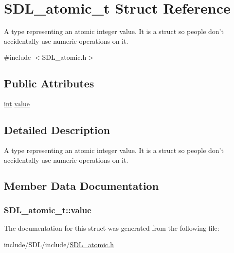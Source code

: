 \hypertarget{struct_s_d_l__atomic__t}{\section{S\-D\-L\-\_\-atomic\-\_\-t Struct Reference}
\label{struct_s_d_l__atomic__t}
}


A type representing an atomic integer value. It is a struct so people don't accidentally use numeric operations on it.  




{\ttfamily \#include $<$S\-D\-L\-\_\-atomic.\-h$>$}

\subsection*{Public Attributes}
\begin{DoxyCompactItemize}
\item 
\hyperlink{_s_d_l__thread_8h_a6a64f9be4433e4de6e2f2f548cf3c08e}{int} \hyperlink{struct_s_d_l__atomic__t_a0d09ddf3cc5798c709edb7cea104203a}{value}
\end{DoxyCompactItemize}


\subsection{Detailed Description}
A type representing an atomic integer value. It is a struct so people don't accidentally use numeric operations on it. 

\subsection{Member Data Documentation}
\hypertarget{struct_s_d_l__atomic__t_a0d09ddf3cc5798c709edb7cea104203a}{
\subsubsection[{value}]{ S\-D\-L\-\_\-atomic\-\_\-t\-::value}}\label{struct_s_d_l__atomic__t_a0d09ddf3cc5798c709edb7cea104203a}


The documentation for this struct was generated from the following file\-:\begin{DoxyCompactItemize}
\item 
include/\-S\-D\-L/include/\hyperlink{_s_d_l__atomic_8h}{S\-D\-L\-\_\-atomic.\-h}\end{DoxyCompactItemize}
